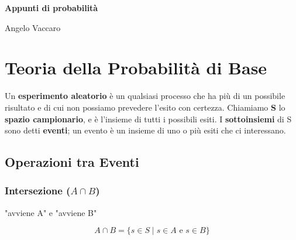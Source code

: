 \documentclass[a4paper, 11pt]{article}
\date{} %
\theoremstyle{definition}
\begin{document}
\begin{titlepage}
    \centering %

    \vspace*{5cm}

    \Huge
    \textbf{Appunti di probabilità}

    \vfill %

    \begin{flushright}
        \Large %
        Angelo Vaccaro
    \end{flushright}

    \vspace{1cm}
\end{titlepage}

\tableofcontents
\newpage

\section{Teoria della Probabilità di Base}

Un \textbf{esperimento aleatorio} è un qualsiasi processo che ha più di un possibile risultato e di cui non possiamo prevedere l'esito con certezza.
Chiamiamo \textbf{S} lo \textbf{spazio campionario}, e è l'insieme di tutti i possibili esiti. I \textbf{sottoinsiemi} di S sono detti \textbf{eventi}; un evento è un insieme di uno o più esiti che ci interessano.

\subsection*{Operazioni tra Eventi}

\subsubsection*{Intersezione ($A \cap B$)}
"avviene A" e "avviene B"
\begin{center}
\end{center}
\[ A \cap B = \{s \in S \mid s \in A \text{ e } s \in B\} \]
\end{document}
